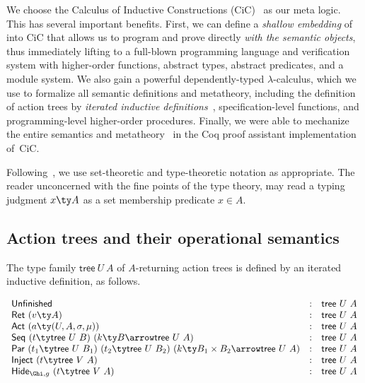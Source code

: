We choose the Calculus of Inductive Constructions
(CiC)~\cite{coq-team,Bertot-Casteran:04} as our meta logic.  This has
several important benefits.  First, we can define a \emph{shallow
  embedding} of \SCST into CiC that allows us to program and prove
directly \emph{with the semantic objects}, thus immediately lifting
\SCST to a full-blown programming language and verification system
with higher-order functions, abstract types, abstract predicates, and
a module system.  We also gain a powerful dependently-typed
$\lambda$-calculus, which we use to formalize all semantic definitions
and metatheory, including the definition of action trees by
\emph{iterated inductive definitions}~\cite{coq-team},
specification-level functions, and programming-level higher-order
procedures.
%
Finally, we were able to mechanize the entire semantics and
metatheory~\cite{fcsl-coqscripts} in the Coq proof assistant
implementation of~CiC.

Following~\cite{LeyWild-Nanevski:POPL13}, we use set-theoretic and
type-theoretic notation as appropriate.
%
The reader unconcerned with the fine points of the type theory, may
read a typing judgment $x \ty A$ as a set membership predicate $x \in
A$.


\subsection{Action trees and their operational semantics}
\label{sec:opsem}
%
The type family $\mathsf{tree}~U~A$ of $A$-returning action trees is
defined by an iterated inductive definition, as follows.

\begin{definition}
\label{def:trees}
\[
\begin{array}{lcr}
  \mathsf{Unfinished} & : & \mathsf{tree}~U~A
  \\
  \mathsf{Ret}\ (v \ty A) & : & \mathsf{tree}~U~A
  \\
  \mathsf{Act}~(a \ty (U, A, \sigma, \mu)) & : & \mathsf{tree}~U~A
  \\
  \mathsf{Seq}~(t \ty \mathsf{tree}~U~B)~(k \ty B \arrow \mathsf{tree}~U~A) & : & 
  \mathsf{tree}~U~A
  \\
  \mathsf{Par}~(t_1 \ty \mathsf{tree}~U~B_1)\ (t_2 \ty \mathsf{tree}~U~B_2)\ (k \ty B_1 \times B_2 \arrow \mathsf{tree}~U~A) & : & 
  \mathsf{tree}~U~A 
  \\
  \mathsf{Inject}~(t \ty \mathsf{tree}~V~A) &:&
  \mathsf{tree}~U~A 
  \\
  \mathsf{Hide}_{\Ghi,g}~(t \ty \mathsf{tree}~V~A) &:&
  \mathsf{tree}~U~A 
\end{array}
\]  
\end{definition}

